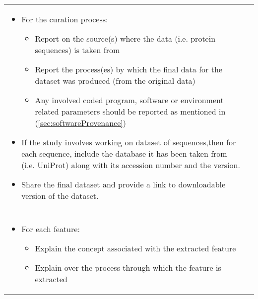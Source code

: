 \begin{table}[ht]
    \centering
    \begin{tabular}{| P{14cm} || p{2cm} |}
        \hline
         \\
        \hline \hline
            \begin{itemize}
                \item
                {\small For the curation process:}
                    \begin{itemize}
                            \item
                            {\footnotesize Report on the source(s) where the data (i.e. protein sequences) is taken from }
                           \item
                            {\footnotesize Report the process(es) by which the final data for the dataset was produced (from the original data)}
                            \item
                            {\footnotesize Any involved coded program, software or environment related parameters should be reported as mentioned in (\ref{sec:softwareProvenance})}
                    \end{itemize}
                \item
                {\small If the study involves working on dataset of sequences,then for each sequence, include the database 
                it has been taken from (i.e. UniProt) along with its accession number and the version. }
                \item
                {\small  Share the final dataset and provide a link to downloadable version of the dataset.}
            \end{itemize} &\\
        \hline
        \\
        \hline \hline
        \begin{itemize}
                \item
                {\small For each feature:}
                    \begin{itemize}
                            \item
                            {\footnotesize Explain the concept associated with the extracted feature }
                            \item
                            {\footnotesize Explain over the process through which the feature is extracted}

\end{itemize}
\end{itemize}
\end{tabular}
\end{table}

